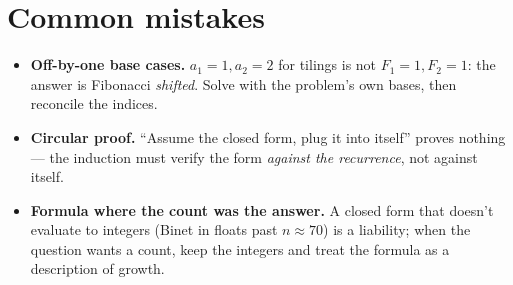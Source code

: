 \section{Common mistakes}
\begin{itemize}
\item \textbf{Off-by-one base cases.} $a_1 = 1, a_2 = 2$ for tilings is
not $F_1 = 1, F_2 = 1$: the answer is Fibonacci \emph{shifted}. Solve
with the problem's own bases, then reconcile the indices.
\item \textbf{Circular proof.} ``Assume the closed form, plug it into
itself'' proves nothing --- the induction must verify the form
\emph{against the recurrence}, not against itself.
\item \textbf{Formula where the count was the answer.} A closed form
that doesn't evaluate to integers (Binet in floats past $n \approx 70$)
is a liability; when the question wants a count, keep the integers and
treat the formula as a description of growth.
\end{itemize}

